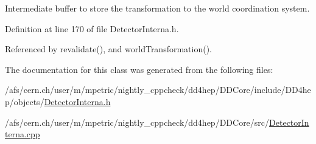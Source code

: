 Intermediate buffer to store the transformation to the world coordination system. 

Definition at line 170 of file DetectorInterna.h.

Referenced by revalidate(), and worldTransformation().

The documentation for this class was generated from the following files:\begin{DoxyCompactItemize}
\item 
/afs/cern.ch/user/m/mpetric/nightly\_\-cppcheck/dd4hep/DDCore/include/DD4hep/objects/\hyperlink{_detector_interna_8h}{DetectorInterna.h}\item 
/afs/cern.ch/user/m/mpetric/nightly\_\-cppcheck/dd4hep/DDCore/src/\hyperlink{_detector_interna_8cpp}{DetectorInterna.cpp}\end{DoxyCompactItemize}
